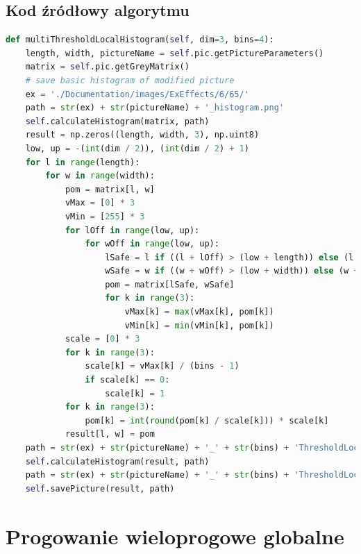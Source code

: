 \documentclass[a4paper,12pt, titlepage]{report}
\begin{document}
\subsection*{Kod źródłowy algorytmu}
\begin{lstlisting}[language=Python]
def multiThresholdLocalHistogram(self, dim=3, bins=4):
    length, width, pictureName = self.pic.getPictureParameters()
    matrix = self.pic.getGreyMatrix()
    # save basic histogram of modified picture
    ex = './Documentation/images/ExEffects/6/65/'
    path = str(ex) + str(pictureName) + '_histogram.png'
    self.calculateHistogram(matrix, path)
    result = np.zeros((length, width, 3), np.uint8)
    low, up = -(int(dim / 2)), (int(dim / 2) + 1)
    for l in range(length):
        for w in range(width):
            pom = matrix[l, w]
            vMax = [0] * 3
            vMin = [255] * 3
            for lOff in range(low, up):
                for wOff in range(low, up):
                    lSafe = l if ((l + lOff) > (low + length)) else (l + lOff)
                    wSafe = w if ((w + wOff) > (low + width)) else (w + wOff)
                    pom = matrix[lSafe, wSafe]
                    for k in range(3):
                        vMax[k] = max(vMax[k], pom[k])
                        vMin[k] = min(vMin[k], pom[k])
            scale = [0] * 3
            for k in range(3):
                scale[k] = vMax[k] / (bins - 1)
                if scale[k] == 0:
                    scale[k] = 1
            for k in range(3):
                pom[k] = int(round(pom[k] / scale[k])) * scale[k]
            result[l, w] = pom
    path = str(ex) + str(pictureName) + '_' + str(bins) + 'ThresholdLocal_histogram.png'
    self.calculateHistogram(result, path)
    path = str(ex) + str(pictureName) + '_' + str(bins) + 'ThresholdLocal.png'
    self.savePicture(result, path)
\end{lstlisting}

\section{Progowanie wieloprogowe globalne}
\end{document}
